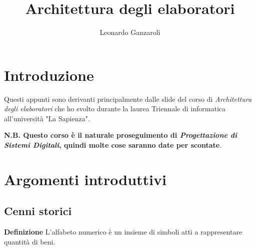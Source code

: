 \documentclass{article}
\title{Architettura degli elaboratori}
\author{Leonardo Ganzaroli}
\date{}
\begin{document}
\maketitle


\tableofcontents

\hypersetup{allcolors=black}

\newpage

\section*{Introduzione}

Questi appunti sono derivanti principalmente dalle slide del corso di \textit{Architettura degli elaboratori} che ho svolto durante la laurea Triennale di informatica all'università "La Sapienza".\newline

\noindent \textbf{N.B. Questo corso è il naturale proseguimento di \textit{Progettazione di Sistemi Digitali}, quindi molte cose saranno date per scontate}.

\newpage

\section{Argomenti introduttivi}

\subsection{Cenni storici}

\textbf{Definizione} L'alfabeto numerico è un insieme di simboli atti a rappresentare quantità di beni.\newline
\end{document}
